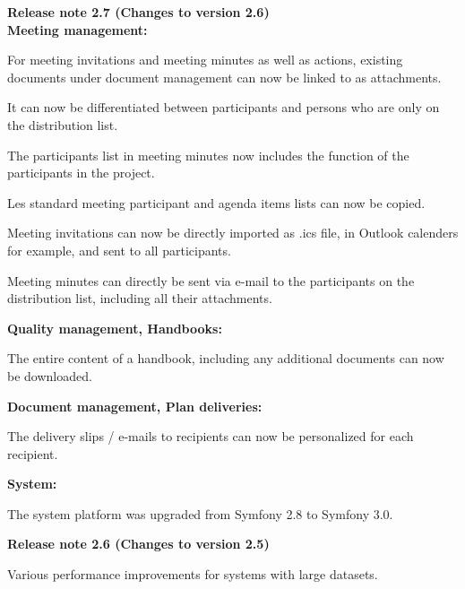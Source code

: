 \textbf{Release note 2.7 (Changes to version 2.6)} \\
\textbf{Meeting management:}
\begin{compactitem}
  \item For meeting invitations and meeting minutes as well as actions, existing documents under document management can now be linked to as attachments.
	\item It can now be differentiated between participants and persons who are only on the distribution list.
	\item The participants list in meeting minutes now includes the function of the participants in the project.
	\item Les standard meeting participant and agenda items lists can now be copied.
	\item Meeting invitations can now be directly imported as .ics file, in Outlook calenders for example, and sent to all participants.
	\item Meeting minutes can directly be sent via e-mail to the participants on the distribution list, including all their attachments.
\end{compactitem}
\textbf{Quality management, Handbooks:}
\begin{compactitem}
  \item The entire content of a handbook, including any additional documents can now be downloaded.
\end{compactitem}
\textbf{Document management, Plan deliveries:}
\begin{compactitem}
  \item The delivery slips / e-mails to recipients can now be personalized for each recipient.
\end{compactitem}
\textbf{System:}
\begin{compactitem}
  \item The system platform was upgraded from Symfony 2.8 to Symfony 3.0.
\end{compactitem}
 
\vspace{\baselineskip}
\textbf{Release note 2.6 (Changes to version 2.5)} \\
\begin{compactitem}
  \item Various performance improvements for systems with large datasets.
\end{compactitem}

\vspace{\baselineskip}


